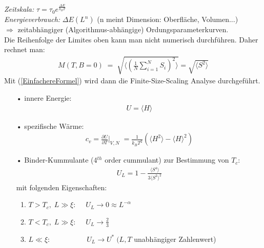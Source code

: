 \documentclass[12pt]{article}
\begin{document}
\textit{Zeitskala:} $\tau = \tau_0 e^\frac{\Delta E}{k_B T}$ \\
\textit{Energieverbrauch:} $\Delta E(L^n)$ (n meint Dimension: Oberfläche, Volumen...)\\ %
$\Rightarrow$ zeitabhängiger (Algorithmus-abhängige) Ordungsparameterkurven. \\
Die Reihenfolge der Limites oben kann man nicht numerisch durchführen. Daher rechnet man: \\
 \begin{align}
  M(T,B=0) \; = \; \sqrt{\langle \left( \frac{1}{N} \sum_{i=1}^N S_i \right)^2 \rangle} = \sqrt{\langle S^2 \rangle} \label{EinfachereFormel}
\end{align} 
Mit (\ref{EinfachereFormel}) wird dann die Finite-Size-Scaling Analyse durchgeführt. 
\begin{itemize}
\item[•] innere Energie: \begin{align*}
U= \langle H \rangle
\end{align*}  
\item[•] spezifische Wärme:
\begin{align*}
 c_v= \frac{\partial U}{\partial T} \bigr\vert _{V,N}\; =\frac{1}{k_B T^2} \left( \langle H ^2 \rangle - \langle H \rangle^2 \right) 
\end{align*}
\item[•] Binder-Kummulante (4$^{th}$ order cummulant) zur Bestimmung von $T_c:$ 
\begin{align*}
U_L = 1-  \frac{\langle S^4 \rangle}{3 \langle S^2 \rangle^2}
\end{align*}
 mit folgenden Eigenschaften:
\begin{enumerate}
\item $T > T_c , \; L \gg \xi:  \quad \; U_L \to 0 \approx L^{- \alpha}$
\item $ T< T_c,  \; L \gg \xi: \quad \; U_L \to \frac{2}{3}$
\item $L \ll \xi: \quad   \quad  \quad  \quad \quad U_L \to U^* \; (L, T$ unabhängiger Zahlenwert)
\end{enumerate}
\end{itemize}
\end{document}
